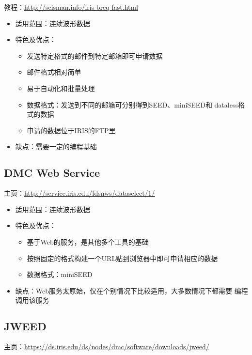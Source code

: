 教程：\url{http://seisman.info/iris-breq-fast.html}

\begin{itemize}
\item 适用范围：连续波形数据
\item 特色及优点：
    \begin{itemize}
    \item 发送特定格式的邮件到特定邮箱即可申请数据
    \item 邮件格式相对简单
    \item 易于自动化和批量处理
    \item 数据格式：发送到不同的邮箱可分别得到SEED、miniSEED和
        dataless格式的数据
    \item 申请的数据位于IRIS的FTP里
    \end{itemize}
\item 缺点：需要一定的编程基础
\end{itemize}

\subsection{DMC Web Service}
主页：\url{http://service.iris.edu/fdsnws/dataselect/1/}

\begin{itemize}
\item 适用范围：连续波形数据
\item 特色及优点：
    \begin{itemize}
    \item 基于Web的服务，是其他多个工具的基础
    \item 按照固定的格式构建一个URL贴到浏览器中即可申请相应的数据
    \item 数据格式：miniSEED
    \end{itemize}
\item 缺点：Web服务太原始，仅在个别情况下比较适用，大多数情况下都需要
    编程调用该服务
\end{itemize}

\subsection{JWEED}
主页：\url{https://ds.iris.edu/ds/nodes/dmc/software/downloads/jweed/}

